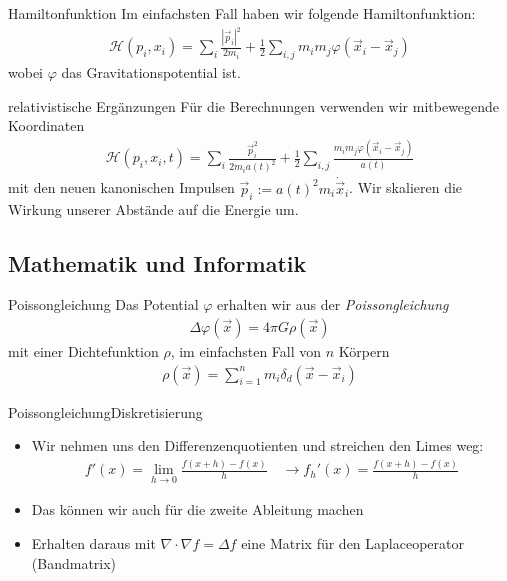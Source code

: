 \documentclass{beamer}
\begin{document}
\begin{frame}{Hamiltonfunktion}
  Im einfachsten Fall haben wir folgende Hamiltonfunktion:
  \begin{align}
    \mathcal H(p_i,x_i) = \sum_i \frac{\left|\vec{p}_i\right|^2}{2m_i} +
    \frac{1}{2}\sum_{i,j} {m_i m_j \varphi(\vec{x}_i - \vec{x}_j)}
    \label{eqn:hamilton}
  \end{align}
  wobei $\varphi$ das Gravitationspotential ist.
\end{frame}

\begin{frame}{relativistische Ergänzungen}
  Für die Berechnungen verwenden wir \alert{mitbewegende Koordinaten}
  \begin{align}
    \mathcal H(p_i,x_i,t) = \sum_i \frac{\vec{p}_i^2}{2m_i a(t)^2} +
    \frac{1}{2}\sum_{i,j} \frac{m_i m_j \varphi(\vec{x}_i - \vec{x}_j)}{a(t)}
    \label{eqn:hamilton_rel}
  \end{align}
  mit den neuen kanonischen Impulsen $\vec p_i := a(t)^2 m_i\dot{\vec{x}}_i$.
  \pause
  \vskip10pt
  Wir skalieren die Wirkung unserer Abstände auf die Energie um.
\end{frame}

\subsection{Mathematik und Informatik}
\begin{frame}{Poissongleichung}
  Das Potential $\varphi$ erhalten wir aus der \emph{Poissongleichung}
  \begin{align}
    \Delta \varphi(\vec{x}) = 4\pi G \rho(\vec{x})
  \end{align}
  mit einer Dichtefunktion $\rho$\pause, im einfachsten Fall von $n$ Körpern
  \begin{align}
    \rho(\vec x) = \sum_{i=1}^n m_i \delta_d(\vec{x} - \vec{x}_i)
  \end{align}
\end{frame}

\begin{frame}{Poissongleichung}{Diskretisierung}
  \begin{itemize}
    \item<1-> Wir nehmen uns den Differenzenquotienten und streichen den Limes weg:
      \begin{align}
        f'(x) = \lim_{h\to 0} \frac{f(x+h) - f(x)}{h} \quad \to f_h'(x) =
        \frac{f(x + h) - f(x)}{h}
      \end{align}
    \item<2-> Das können wir auch für die zweite Ableitung machen
    \item<3-> Erhalten daraus mit $\nabla \cdot \nabla f = \Delta f$ eine Matrix für
      den Laplaceoperator (Bandmatrix)
  \end{itemize}
\end{frame}
\end{document}
